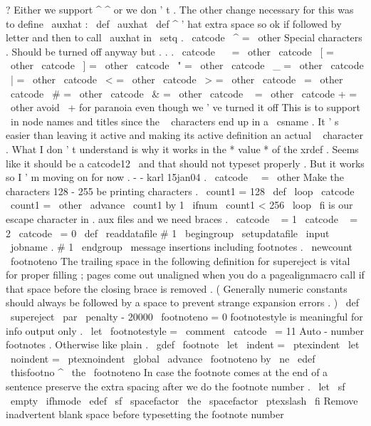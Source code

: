 {{?
Either
we
support
^
^
or
we
don
'
t
.
%
%
The
other
change
necessary
for
this
was
to
define
\
auxhat
:
%
\
def
\
auxhat
{
\
def
^
{
'
hat
}
}
%
extra
space
so
ok
if
followed
by
letter
%
and
then
to
call
\
auxhat
in
\
setq
.
%
\
catcode
\
^
=
\
other
%
%
Special
characters
.
Should
be
turned
off
anyway
but
.
.
.
\
catcode
\
~
=
\
other
\
catcode
\
[
=
\
other
\
catcode
\
]
=
\
other
\
catcode
\
"
=
\
other
\
catcode
\
_
=
\
other
\
catcode
\
|
=
\
other
\
catcode
\
<
=
\
other
\
catcode
\
>
=
\
other
\
catcode
\
=
\
other
\
catcode
\
#
=
\
other
\
catcode
\
&
=
\
other
\
catcode
\
%
=
\
other
\
catcode
+
=
\
other
%
avoid
\
+
for
paranoia
even
though
we
'
ve
turned
it
off
%
%
This
is
to
support
\
in
node
names
and
titles
since
the
\
%
characters
end
up
in
a
\
csname
.
It
'
s
easier
than
%
leaving
it
active
and
making
its
active
definition
an
actual
\
%
character
.
What
I
don
'
t
understand
is
why
it
works
in
the
*
value
*
%
of
the
xrdef
.
Seems
like
it
should
be
a
catcode12
\
and
that
%
should
not
typeset
properly
.
But
it
works
so
I
'
m
moving
on
for
%
now
.
-
-
karl
15jan04
.
\
catcode
\
\
=
\
other
%
%
Make
the
characters
128
-
255
be
printing
characters
.
{
%
\
count1
=
128
\
def
\
loop
{
%
\
catcode
\
count1
=
\
other
\
advance
\
count1
by
1
\
ifnum
\
count1
<
256
\
loop
\
fi
}
%
}
%
%
%
is
our
escape
character
in
.
aux
files
and
we
need
braces
.
\
catcode
\
{
=
1
\
catcode
\
}
=
2
\
catcode
\
=
0
}
\
def
\
readdatafile
#
1
{
%
\
begingroup
\
setupdatafile
\
input
\
jobname
.
#
1
\
endgroup
}
\
message
{
insertions
}
%
including
footnotes
.
\
newcount
\
footnoteno
%
The
trailing
space
in
the
following
definition
for
supereject
is
%
vital
for
proper
filling
;
pages
come
out
unaligned
when
you
do
a
%
pagealignmacro
call
if
that
space
before
the
closing
brace
is
%
removed
.
(
Generally
numeric
constants
should
always
be
followed
by
a
%
space
to
prevent
strange
expansion
errors
.
)
\
def
\
supereject
{
\
par
\
penalty
-
20000
\
footnoteno
=
0
}
%
footnotestyle
is
meaningful
for
info
output
only
.
\
let
\
footnotestyle
=
\
comment
{
\
catcode
\
=
11
%
%
Auto
-
number
footnotes
.
Otherwise
like
plain
.
\
gdef
\
footnote
{
%
\
let
\
indent
=
\
ptexindent
\
let
\
noindent
=
\
ptexnoindent
\
global
\
advance
\
footnoteno
by
\
ne
\
edef
\
thisfootno
{
^
{
\
the
\
footnoteno
}
}
%
%
%
In
case
the
footnote
comes
at
the
end
of
a
sentence
preserve
the
%
extra
spacing
after
we
do
the
footnote
number
.
\
let
\
sf
\
empty
\
ifhmode
\
edef
\
sf
{
\
spacefactor
\
the
\
spacefactor
}
\
ptexslash
\
fi
%
%
Remove
inadvertent
blank
space
before
typesetting
the
footnote
number
}}}

